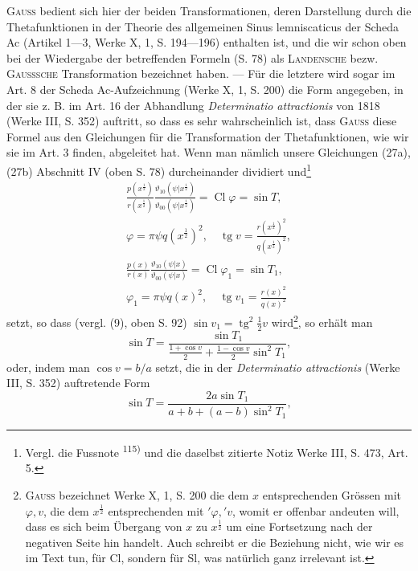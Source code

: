 \textsc{Gauss} bedient sich hier der beiden Transformationen, deren Darstellung
durch die Thetafunktionen in der Theorie des allgemeinen Sinus lemniscaticus
der Scheda Ac (Artikel 1—3, Werke X, 1, S. 194—196) enthalten
ist, und die wir schon oben bei der Wiedergabe der betreffenden Formeln
(S. 78) als \textsc{Landensche} bezw. \textsc{Gausssche} Transformation bezeichnet haben. —
Für die letztere wird sogar im Art. 8 der Scheda Ac-Aufzeichnung (Werke
X, 1, S. 200) die Form angegeben, in der sie z. B. im Art. 16 der Abhandlung
\textit{Determinatio attractionis} von 1818 (Werke III, S. 352) auftritt, so
dass es sehr wahrscheinlich ist, dass \textsc{Gauss} diese Formel aus den Gleichungen
für die Transformation der Thetafunktionen, wie wir sie im Art. 3 finden,
abgeleitet hat. Wenn man nämlich unsere Gleichungen (27a), (27b) Abschnitt
IV (oben S. 78) durcheinander dividiert und\footnote{Vergl. die Fussnote \textsuperscript{115)} und die daselbst zitierte Notiz Werke III, S. 473, Art. 5.}
\clearpage{}
\[
\begin{gathered}
\frac{p(x^{\frac12})}{r(x^{\frac12})}\frac{\vartheta_{10}(\psi|x^{\frac12})}{\vartheta_{00}(\psi|x^{\frac12})}
=\operatorname{Cl}\varphi=\sin T,\\
\varphi=\pi\psi q(x^{\frac12})^2,\quad\operatorname{tg}v=\frac{r(x^{\frac12})^2}{q(x^{\frac12})^2},\\[5pt]
\frac{p(x)}{r(x)}\frac{\vartheta_{10}(\psi|x)}{\vartheta_{00}(\psi|x)}
=\operatorname{Cl}\varphi_1=\sin T_1,\\
\varphi_1=\pi\psi q(x)^2,\quad\operatorname{tg}v_1=\frac{r(x)^2}{q(x)^2}
\end{gathered}
\]
\noindent setzt, so dass (vergl. (9), oben S. 92) \(\sin v_1=\operatorname{tg}^2\frac12v\) wird\footnote{\textsc{Gauss} bezeichnet Werke X, 1, S. 200 die dem \(x\) entsprechenden Grössen mit \(\varphi,v\), die dem \(x^{\frac12}\) entsprechenden mit \({}'\varphi,{}'v\), womit er offenbar andeuten will, dass es sich beim Übergang von \(x\) zu \(x^{\frac12}\) um eine Fortsetzung nach der negativen Seite hin handelt. Auch schreibt er die Beziehung nicht, wie wir es im Text tun, für Cl, sondern für Sl, was natürlich ganz irrelevant ist.}, so erhält man
\[
\sin T=\frac{\sin T_1}{\frac{1+\cos v}2+\frac{1-\cos v}2\sin^2T_1},
\]
\noindent oder, indem man \(\cos v=b/a\) setzt, die in der \textit{Determinatio attractionis} (Werke
III, S. 352) auftretende Form
\begingroup\makeatletter\tagsleft@true\let\veqno\leqno\makeatother
\begin{equation*}
\sin T=\frac{2a\sin T_1}{a+b+(a-b)\sin^2T_1},\tag{26}
\end{equation*}
